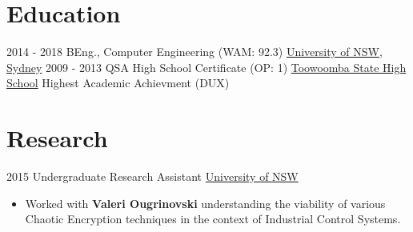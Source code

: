 \documentclass[letterpaper]{twentysecondcv} %
\begin{document}
\makeprofile %

\section{Education}

\begin{twenty} %
	\twentyitem
    	{2014 - 2018}
        {}
        {BEng., Computer Engineering \textnormal{(WAM: 92.3)}}
        {\href{http://www.unsw.edu.au/}{University of NSW, Sydney}}
        {}
        {}
	\twentyitem
    	{2009 - 2013}
		{}
        {QSA High School Certificate \textnormal{(OP: 1)}}
        {\href{http://www.unipune.ac.in/}{Toowoomba State High School}}
        {}
        {Highest Academic Achievment (DUX)}
\end{twenty} \vspace{5mm}

\section{Research}
\begin{twenty}
	\twentyitem
    	{2015}
		{}
        {Undergraduate Research Assistant}
        {\href{http://www.uoguelph.ca/}{University of NSW}}
        {}
        {
        {\begin{itemize}
        \item Worked with \textbf{Valeri Ougrinovski} understanding the viability of various Chaotic Encryption techniques in the context of Industrial Control Systems. 
		\end{itemize}}
        }
\end{twenty} \vspace{5mm}
\end{document}
